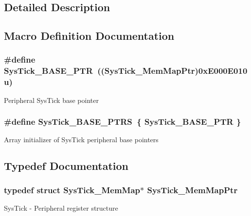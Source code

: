 \subsection{Detailed Description}


\subsection{Macro Definition Documentation}
\hypertarget{group___sys_tick___peripheral_gaeef73642fdef722ce658e468dad877ea}{}
\subsubsection[{Sys\+Tick\+\_\+\+B\+A\+S\+E\+\_\+\+P\+T\+R}]{\setlength{\rightskip}{0pt plus 5cm}\#define Sys\+Tick\+\_\+\+B\+A\+S\+E\+\_\+\+P\+T\+R~(({\bf Sys\+Tick\+\_\+\+Mem\+Map\+Ptr})0x\+E000\+E010u)}\label{group___sys_tick___peripheral_gaeef73642fdef722ce658e468dad877ea}
Peripheral Sys\+Tick base pointer \hypertarget{group___sys_tick___peripheral_ga0c9d5fa2fdb81e177e61d0e980507c51}{}
\subsubsection[{Sys\+Tick\+\_\+\+B\+A\+S\+E\+\_\+\+P\+T\+R\+S}]{\setlength{\rightskip}{0pt plus 5cm}\#define Sys\+Tick\+\_\+\+B\+A\+S\+E\+\_\+\+P\+T\+R\+S~\{ {\bf Sys\+Tick\+\_\+\+B\+A\+S\+E\+\_\+\+P\+T\+R} \}}\label{group___sys_tick___peripheral_ga0c9d5fa2fdb81e177e61d0e980507c51}
Array initializer of Sys\+Tick peripheral base pointers 

\subsection{Typedef Documentation}
\hypertarget{group___sys_tick___peripheral_ga19e2a0c9400dcdfd462a92ca83cff253}{}
\subsubsection[{Sys\+Tick\+\_\+\+Mem\+Map\+Ptr}]{\setlength{\rightskip}{0pt plus 5cm}typedef struct {\bf Sys\+Tick\+\_\+\+Mem\+Map}$\ast$ {\bf Sys\+Tick\+\_\+\+Mem\+Map\+Ptr}}\label{group___sys_tick___peripheral_ga19e2a0c9400dcdfd462a92ca83cff253}
Sys\+Tick -\/ Peripheral register structure 